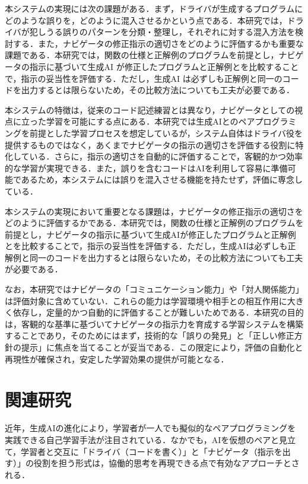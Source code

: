\documentclass[twoside,twocolumn,10pt]{jsarticle}
\begin{document}
本システムの実現には次の課題がある．まず，ドライバが生成するプログラムにどのような誤りを，どのように混入させるかという点である．本研究では，ドライバが犯しうる誤りのパターンを分類・整理し，それぞれに対する混入方法を検討する．また，ナビゲータの修正指示の適切さをどのように評価するかも重要な課題である．本研究では，関数の仕様と正解例のプログラムを前提とし，ナビゲータの指示に基づいて生成AI が修正したプログラムと正解例とを比較することで，指示の妥当性を評価する．ただし，生成AI は必ずしも正解例と同一のコードを出力するとは限らないため，その比較方法についても工夫が必要である．

本システムの特徴は，従来のコード記述練習とは異なり，ナビゲータとしての視点に立った学習を可能にする点にある．本研究では生成AIとのペアプログラミングを前提とした学習プロセスを想定しているが，システム自体はドライバ役を提供するものではなく，あくまでナビゲータの指示の適切さを評価する役割に特化している．さらに，指示の適切さを自動的に評価することで，客観的かつ効率的な学習が実現できる．また，誤りを含むコードはAIを利用して容易に準備可能であるため，本システムには誤りを混入させる機能を持たせず，評価に専念している．

本システムの実現において重要となる課題は，ナビゲータの修正指示の適切さをどのように評価するかである．本研究では，関数の仕様と正解例のプログラムを前提とし，ナビゲータの指示に基づいて生成AIが修正したプログラムと正解例とを比較することで，指示の妥当性を評価する．ただし，生成AIは必ずしも正解例と同一のコードを出力するとは限らないため，その比較方法についても工夫が必要である．

なお，本研究ではナビゲータの「コミュニケーション能力」や「対人関係能力」は評価対象に含めていない．これらの能力は学習環境や相手との相互作用に大きく依存し，定量的かつ自動的に評価することが難しいためである．本研究の目的は，客観的な基準に基づいてナビゲータの指示力を育成する学習システムを構築することであり，そのためにはまず，技術的な「誤りの発見」と「正しい修正方針の提示」に焦点を当てることが妥当である．この限定により，評価の自動化と再現性が確保され，安定した学習効果の提供が可能となる．

\section{関連研究}\label{sec:関連研究}

近年，生成AIの進化により，学習者が一人でも擬似的なペアプログラミングを実践できる自己学習手法が注目されている．なかでも，AIを仮想のペアと見立て，学習者と交互に「ドライバ（コードを書く）」と「ナビゲータ（指示を出す）」の役割を担う形式は，協働的思考を再現できる点で有効なアプローチとされる．
\end{document}
